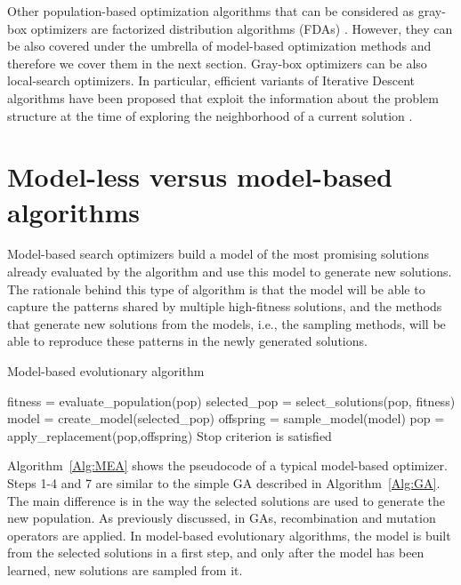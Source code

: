   Other population-based optimization algorithms that can be considered as gray-box optimizers are factorized distribution algorithms (FDAs) \cite{Muhlenbein_et_al:1999}. However, they can be also covered under the umbrella of model-based optimization methods and therefore we cover them in the next section. Gray-box optimizers can be also local-search optimizers. In particular, efficient variants of Iterative Descent algorithms have been proposed that exploit the information about the problem structure at the time of exploring the neighborhood of a current solution \cite{Chicano_et_al:2016,Whitley_et_al:2013}.

 

 \section{Model-less versus model-based algorithms}  \label{sec:LESS_VS_MODEL}


 Model-based search optimizers build a model of the most promising solutions already evaluated by the algorithm and use this model to generate new solutions. The rationale behind this type of algorithm is that the model will be able to capture the patterns shared by multiple high-fitness solutions, and the  methods that generate new solutions from the models, i.e., the sampling methods, will be able to reproduce these patterns in the newly generated solutions.

 
 \begin{algorithm}[ht!]
  \caption{Model-based evolutionary algorithm}
  \begin{algorithmic}[1]
      \REPEAT 
         \STATE  fitness = evaluate\_population(pop)
         \STATE  selected\_pop = select\_solutions(pop, fitness)
         \STATE  model = create\_model(selected\_pop)
         \STATE  offspring = sample\_model(model)
         \STATE  pop =  apply\_replacement(pop,offspring)       
       \UNTIL Stop criterion is satisfied		
     \end{algorithmic}
	
 \label{Alg:MEA}
 \end{algorithm}
 
 Algorithm~\ref{Alg:MEA} shows the pseudocode of a typical model-based optimizer. Steps 1-4 and 7 are similar to the simple GA described in Algorithm~\ref{Alg:GA}. The main difference is in the way the selected solutions are used to generate the new population. As previously discussed, in GAs, recombination and mutation operators are applied. In model-based evolutionary algorithms, the model is built from the selected solutions in a first step, and only after the model has been learned, new solutions are sampled from it.

